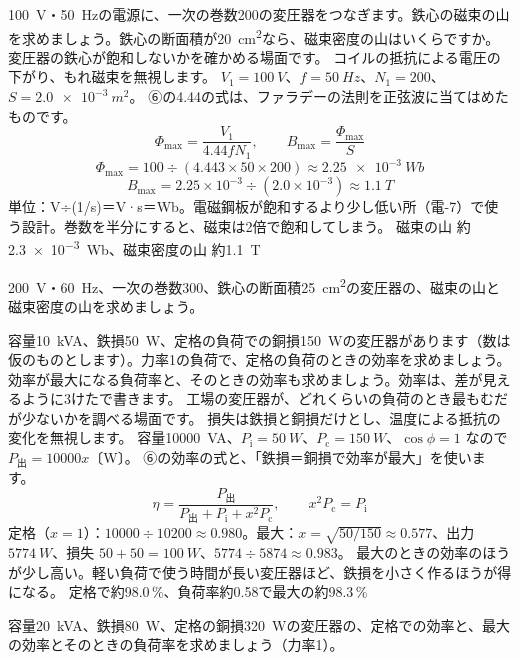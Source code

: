 \label{ph:電-12:ex6}
\begin{phreidai}[変圧器の鉄心の磁束]
\qty{100}{V}・\qty{50}{Hz}の電源に、一次の巻数200の変圧器をつなぎます。鉄心の磁束の山を求めましょう。鉄心の断面積が\qty{20}{cm^2}なら、磁束密度の山はいくらですか。
\phbamen
変圧器の鉄心が飽和しないかを確かめる場面です。
\phmushi
コイルの抵抗による電圧の下がり、もれ磁束を無視します。
\phzu
$V_1=\qty{100}{V}$、$f=\qty{50}{Hz}$、$N_1=200$、$S=\qty{2.0e-3}{m^2}$。
\phriyu
⑥の4.44の式は、ファラデーの法則を正弦波に当てはめたものです。
\phtateru
\[\Phi_{\max}=\frac{V_1}{4.44fN_1},\qquad B_{\max}=\frac{\Phi_{\max}}{S}\]
\phtoku
\[\Phi_{\max}=100\div(4.443\times50\times200)\approx\qty{2.25e-3}{Wb}\]
\[B_{\max}=2.25\times10^{-3}\div(2.0\times10^{-3})\approx\qty{1.1}{T}\]
\phtashikame
単位：V÷(1/s)＝V·s＝Wb。電磁鋼板が飽和するより少し低い所（電-7）で使う設計。巻数を半分にすると、磁束は2倍で飽和してしまう。
\kotae 磁束の山 約\qty{2.3e-3}{Wb}、磁束密度の山 約\qty{1.1}{T}
\end{phreidai}
\begin{jibun}
\qty{200}{V}・\qty{60}{Hz}、一次の巻数300、鉄心の断面積\qty{25}{cm^2}の変圧器の、磁束の山と磁束密度の山を求めましょう。
\end{jibun}

\label{ph:電-12:ex7}
\begin{phreidai}[変圧器の効率]
容量\qty{10}{kVA}、鉄損\qty{50}{W}、定格の負荷での銅損\qty{150}{W}の変圧器があります（数は仮のものとします）。力率1の負荷で、定格の負荷のときの効率を求めましょう。効率が最大になる負荷率と、そのときの効率も求めましょう。効率は、差が見えるように3けたで書きます。
\phbamen
工場の変圧器が、どれくらいの負荷のとき最もむだが少ないかを調べる場面です。
\phmushi
損失は鉄損と銅損だけとし、温度による抵抗の変化を無視します。
\phzu
容量\qty{10000}{VA}、$P_{\mathrm i}=\qty{50}{W}$、$P_{\mathrm c}=\qty{150}{W}$、$\cos\phi=1$ なので $P_{\text{出}}=\num{10000}x$〔W〕。
\phriyu
⑥の効率の式と、「鉄損＝銅損で効率が最大」を使います。
\phtateru
\[\eta=\frac{P_{\text{出}}}{P_{\text{出}}+P_{\mathrm i}+x^2P_{\mathrm c}},\qquad x^2P_{\mathrm c}=P_{\mathrm i}\]
\phtoku
定格（$x=1$）：$\num{10000}\div\num{10200}\approx0.980$。最大：$x=\sqrt{50/150}\approx0.577$、出力 $\qty{5774}{W}$、損失 $50+50=\qty{100}{W}$、$5774\div5874\approx0.983$。
\phtashikame
最大のときの効率のほうが少し高い。軽い負荷で使う時間が長い変圧器ほど、鉄損を小さく作るほうが得になる。
\kotae 定格で約98.0\,\%、負荷率約0.58で最大の約98.3\,\%
\end{phreidai}
\begin{jibun}
容量\qty{20}{kVA}、鉄損\qty{80}{W}、定格の銅損\qty{320}{W}の変圧器の、定格での効率と、最大の効率とそのときの負荷率を求めましょう（力率1）。
\end{jibun}

